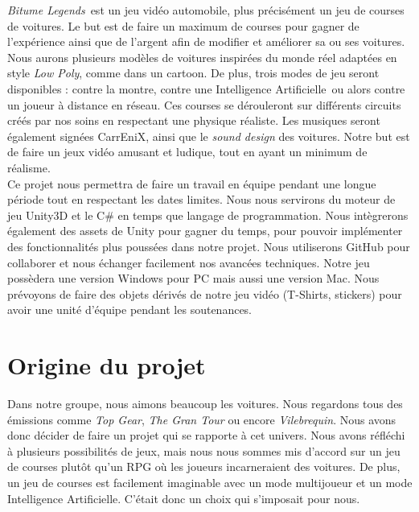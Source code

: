 \documentclass[12pt,a4paper]{article}
\newcommand{\btmlgs}{\textit{Bitume Legends}}
\newcommand{\AI}{Intelligence Artificielle}
\newcommand{\CEX}{CarrEniX}
\begin{document}
  \btmlgs\, est un jeu vidéo automobile, plus précisément un jeu de courses de voitures. Le but est 
  de faire un maximum de courses pour gagner de l'expérience ainsi que de l'argent afin de
  modifier et améliorer sa ou ses voitures.
  Nous aurons plusieurs modèles de voitures inspirées du monde réel adaptées en style \textit{Low Poly},
  comme dans un cartoon. De plus, trois modes de jeu seront disponibles : contre la montre, contre une \AI\,
  ou alors contre un joueur à distance en réseau. Ces courses se dérouleront sur différents circuits créés 
  par nos soins en respectant une physique réaliste.
  Les musiques seront également signées \CEX, ainsi que le \textit{sound design} des voitures.
  Notre but est de faire un jeux vidéo amusant et ludique, tout en ayant un minimum de réalisme.\\
  
  Ce projet nous permettra de faire un travail en équipe pendant une longue période tout en respectant les dates limites.
  Nous nous servirons du moteur de jeu Unity3D et le C\# en temps que langage de programmation. Nous intègrerons 
  également des assets de Unity pour gagner du temps, pour pouvoir implémenter des fonctionnalités plus poussées dans notre projet.
  Nous utiliserons GitHub pour collaborer et nous échanger facilement nos avancées techniques.
  Notre jeu possèdera une version Windows pour PC mais aussi une version Mac.
  Nous prévoyons de faire des objets dérivés de notre jeu vidéo (T-Shirts, stickers) pour avoir une unité d'équipe 
  pendant les soutenances.\\
  
  
\clearpage

\section{Origine du projet}
  Dans notre groupe, nous aimons beaucoup les voitures. Nous regardons tous des émissions comme 
  \textit{Top Gear}, \textit{The Gran Tour} ou encore \textit{Vilebrequin}. Nous avons donc décider de faire
  un projet qui se rapporte à cet univers. Nous avons réfléchi à plusieurs possibilités de jeux, mais nous
  nous sommes mis d'accord sur un jeu de courses plutôt qu'un RPG où les joueurs incarneraient des voitures.
  De plus, un jeu de courses est facilement imaginable avec un mode multijoueur et un mode Intelligence 
  Artificielle. C'était donc un choix qui s'imposait pour nous.\\
  
\end{document}
